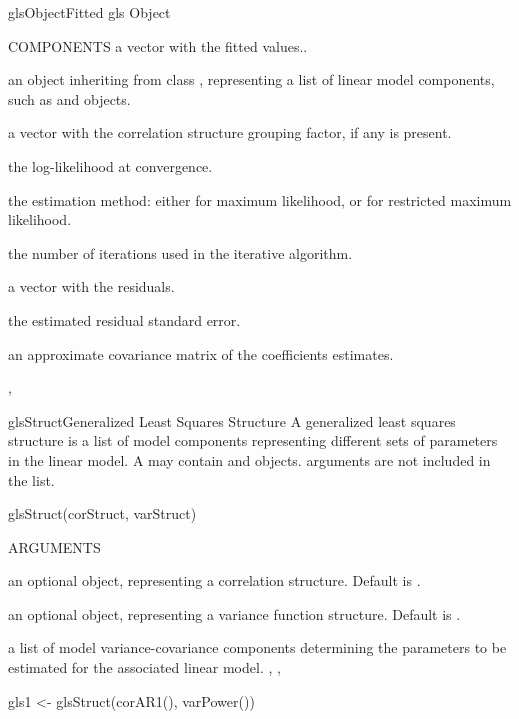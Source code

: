 \documentclass[pdftex]{article} \usepackage{url,graphicx}
\begin{document}
\begin{Helpfile}{glsObject}{Fitted gls Object}
\begin{Argument}{COMPONENTS}
a vector with the fitted values..
\item[\Co{glsStruct:}]
an object inheriting from class ,
representing a list of linear model components, such as
 and  objects.
\item[\Co{groups:}]
a vector with the correlation structure grouping factor,
if any is present.
\item[\Co{logLik:}]
the log-likelihood at convergence.
\item[\Co{method:}]
the estimation method: either  for maximum
likelihood, or  for restricted maximum likelihood.
\item[\Co{numIter:}]
the number of iterations used in the iterative
algorithm.
\item[\Co{residuals:}]
a vector with the residuals.
\item[\Co{sigma:}]
the estimated residual standard error.
\item[\Co{varBeta:}]
an approximate covariance matrix of the
coefficients estimates.
\end{Argument}
, 
\end{Helpfile}
\begin{Helpfile}{glsStruct}{Generalized Least Squares Structure}
A generalized least squares structure is a list of model components
representing different sets of parameters in the linear 
model. A   may contain  and
 objects.  arguments are not included in the
 list.
\begin{Example}
glsStruct(corStruct, varStruct)
\end{Example}
\begin{Argument}{ARGUMENTS}
\item[\Co{corStruct:}]
an optional  object, representing a
correlation structure. Default is .
\item[\Co{varStruct:}]
an optional  object, representing a
variance function structure. Default is .
\end{Argument}
a list of model variance-covariance components determining the
parameters to be estimated for the associated linear model.
, ,
\need 15pt
\vspace{-16pt} 
\begin{Example}
gls1 <- glsStruct(corAR1(), varPower())
\end{Example}
\end{Helpfile}
\end{document}
